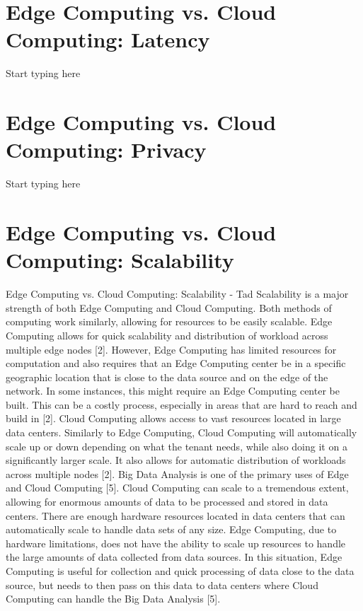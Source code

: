 \documentclass[conference]{IEEEtran}
\begin{document}
\section{Edge Computing vs. Cloud Computing: Latency}
Start typing here

\section{Edge Computing vs. Cloud Computing: Privacy}
Start typing here

\section{Edge Computing vs. Cloud Computing: Scalability}
Edge Computing vs. Cloud Computing: Scalability - Tad
Scalability is a major strength of both Edge Computing and Cloud Computing. Both methods of computing work similarly, allowing for resources to be easily scalable. Edge Computing allows for quick scalability and distribution of workload across multiple edge nodes [2]. However, Edge Computing has limited resources for computation and also requires that an Edge Computing center be in a specific geographic location that is close to the data source and on the edge of the network. In some instances, this might require an Edge Computing center be built. This can be a costly process, especially in areas that are hard to reach and build in [2]. Cloud Computing allows access to vast resources located in large data centers. Similarly to Edge Computing, Cloud Computing will automatically scale up or down depending on what the tenant needs, while also doing it on a significantly larger scale. It also allows for automatic distribution of workloads across multiple nodes [2].
Big Data Analysis is one of the primary uses of Edge and Cloud Computing [5]. Cloud Computing can scale to a tremendous extent, allowing for enormous amounts of data to be processed and stored in data centers. There are enough hardware resources located in data centers that can automatically scale to handle data sets of any size. Edge Computing, due to hardware limitations, does not have the ability to scale up resources to handle the large amounts of data collected from data sources. In this situation, Edge Computing is useful for collection and quick processing of data close to the data source, but needs to then pass on this data to data centers where Cloud Computing can handle the Big Data Analysis [5].
\end{document}
